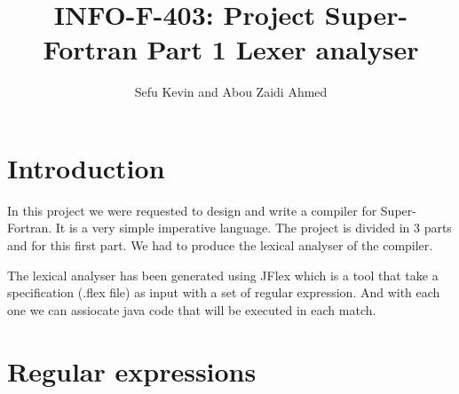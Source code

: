\documentclass[12pt]{article}
\title{INFO-F-403: Project Super-Fortran Part 1 Lexer analyser}
\author{Sefu Kevin and Abou Zaidi Ahmed}
\begin{document}
\maketitle
\section{Introduction}
In this project we were requested to design and write a compiler for Super-Fortran. It is a very simple 
imperative language. The project is divided in 3 parts and for this first part. We had to produce 
the lexical analyser of the compiler.

The lexical analyser has been generated using JFlex which is a tool that take a specification (.flex file)
as input with a set of regular expression. And with each one we can assiocate java code that will
be executed in each match.

\section{Regular expressions}
\end{document}
